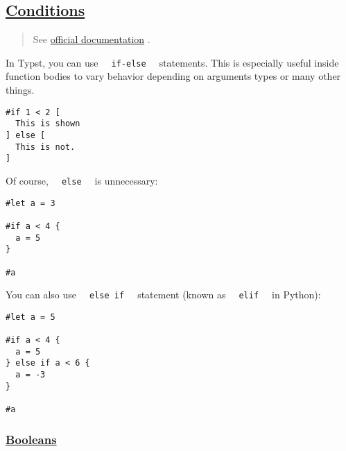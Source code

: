 \subsection{\texorpdfstring{\hyperref[conditions]{Conditions}}{Conditions}}\label{conditions}

\begin{quote}
See
\href{https://typst.app/docs/reference/scripting/\#conditionals}{official
documentation} .
\end{quote}

In Typst, you can use \texttt{\ }{\texttt{\ if-else\ }}\texttt{\ }
statements. This is especially useful inside function bodies to vary
behavior depending on arguments types or many other things.

\begin{verbatim}
#if 1 < 2 [
  This is shown
] else [
  This is not.
]
\end{verbatim}

\pandocbounded{}

Of course, \texttt{\ }{\texttt{\ else\ }}\texttt{\ } is unnecessary:

\begin{verbatim}
#let a = 3

#if a < 4 {
  a = 5
}

#a
\end{verbatim}

\pandocbounded{}

You can also use \texttt{\ }{\texttt{\ else\ if\ }}\texttt{\ } statement
(known as \texttt{\ }{\texttt{\ elif\ }}\texttt{\ } in Python):

\begin{verbatim}
#let a = 5

#if a < 4 {
  a = 5
} else if a < 6 {
  a = -3
}

#a
\end{verbatim}

\pandocbounded{}

\subsubsection{\texorpdfstring{\hyperref[booleans]{Booleans}}{Booleans}}\label{booleans}

